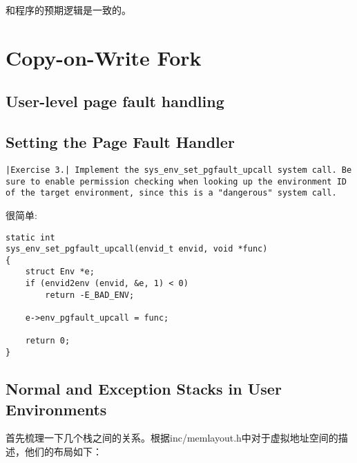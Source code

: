 \documentclass{article}
\begin{document}
\begin{CJK*}{UTF8}{gkai}
和程序的预期逻辑是一致的。


\section{Copy-on-Write Fork}

\subsection{User-level page fault handling}

\subsection{Setting the Page Fault Handler}

\begin{lstlisting}[style=exercise]
|Exercise 3.| Implement the sys_env_set_pgfault_upcall system call. Be sure to enable permission checking when looking up the environment ID of the target environment, since this is a "dangerous" system call.
\end{lstlisting}

很简单:

\begin{lstlisting}[style=ccode, title={\scriptsize \ttfamily \bfseries kern/syscall.c: sys\_env\_set\_pgfault\_upcall()}]
static int
sys_env_set_pgfault_upcall(envid_t envid, void *func)
{
    struct Env *e;
    if (envid2env (envid, &e, 1) < 0)
        return -E_BAD_ENV;

    e->env_pgfault_upcall = func;

    return 0;
}
\end{lstlisting}


\subsection{Normal and Exception Stacks in User Environments}

首先梳理一下几个栈之间的关系。根据inc/memlayout.h中对于虚拟地址空间的描述，他们的布局如下：


\end{CJK*}
\end{document}
